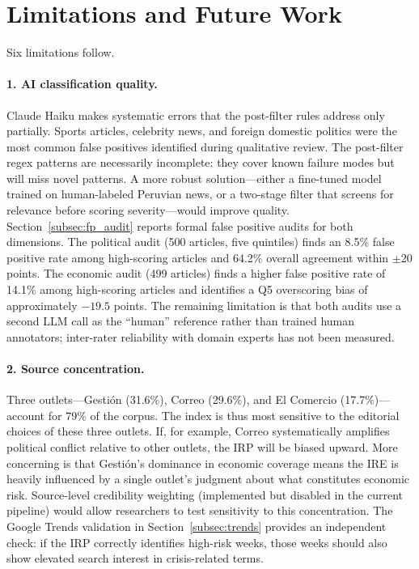 \documentclass[12pt,a4paper]{article}
\begin{document}
\section{Limitations and Future Work}
\label{sec:limitations}

Six limitations follow.

\paragraph{1. AI classification quality.}
Claude Haiku makes systematic errors that the post-filter rules address
only partially.  Sports articles, celebrity news, and foreign domestic
politics were the most common false positives identified during qualitative
review.  The post-filter regex patterns are necessarily incomplete: they
cover known failure modes but will miss novel patterns.  A more robust
solution---either a fine-tuned model trained on human-labeled Peruvian
news, or a two-stage filter that screens for relevance before scoring
severity---would improve quality.  Section~\ref{subsec:fp_audit} reports formal false positive audits for
both dimensions.  The political audit (500 articles, five quintiles) finds
an 8.5\% false positive rate among high-scoring articles and 64.2\%
overall agreement within $\pm$20 points.  The economic audit (499 articles)
finds a higher false positive rate of 14.1\% among high-scoring articles
and identifies a Q5 overscoring bias of approximately $-19.5$ points.
The remaining limitation is that both audits use a second LLM call as the
``human'' reference rather than trained human annotators; inter-rater
reliability with domain experts has not been measured.

\label{subsec:limitations_sources}
\paragraph{2. Source concentration.}
Three outlets---Gesti\'on (31.6\%), Correo (29.6\%), and El Comercio
(17.7\%)---account for 79\% of the corpus.  The index is thus most sensitive
to the editorial choices of these three outlets.  If, for example, Correo
systematically amplifies political conflict relative to other outlets, the
IRP will be biased upward.  More concerning is that Gesti\'on's dominance
in economic coverage means the IRE is heavily influenced by a single
outlet's judgment about what constitutes economic risk.  Source-level
credibility weighting (implemented but disabled in the current pipeline)
would allow researchers to test sensitivity to this concentration.
The Google Trends validation in Section~\ref{subsec:trends} provides an independent check: if the IRP correctly identifies high-risk weeks, those weeks should also show elevated search interest in crisis-related terms.
\end{document}
